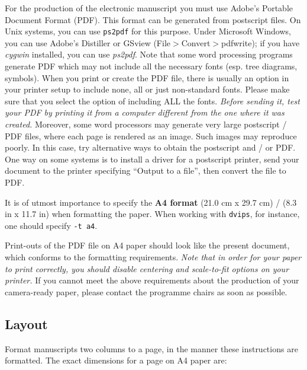 \documentclass[11pt]{article}
\begin{document}
For the production of the electronic manuscript you must use Adobe's
Portable Document Format (PDF). This format can be generated from
postscript files. On Unix systems, you can use {\tt ps2pdf} for
this purpose. Under Microsoft Windows, you can use Adobe's Distiller
or GSview (File$>$Convert$>$pdfwrite); if you have \textit{cygwin}
installed, you can use \textit{ps2pdf}. Note that
some word processing programs generate PDF which may not include all
the necessary fonts (esp. tree diagrams, symbols). When you print or
create the PDF file, there is usually an option in your printer setup
to include none, all or just non-standard fonts.  Please make sure
that you select the option of including ALL the fonts. {\em Before
sending it, test your PDF by printing it from a computer different
from the one where it was created.} Moreover, some word processors may
generate very large postscript / PDF files, where each page is rendered
as an image. Such images may reproduce poorly. In this case, try
alternative ways to obtain the postscript and / or PDF. One way on some
systems is to install a driver for a postscript printer, send your
document to the printer specifying ``Output to a file'', then convert
the file to PDF.


It is of utmost importance to specify the \textbf{A4 format} (21.0 cm
x 29.7 cm) / (8.3 in x 11.7 in) when formatting the paper. When working with
{\tt dvips}, for instance, one should specify {\tt -t a4}.

Print-outs of the PDF file on A4 paper should look like the present document,
which conforms to the formatting requirements. {\em Note that in order for
your paper to print correctly, you should disable centering and scale-to-fit
options on your printer.} If you cannot meet the above requirements about the
production of your camera-ready paper, please contact the programme chairs
as soon as possible.


\subsection{Layout}
\label{ssec:layout}

Format manuscripts two columns to a page, in the manner these
instructions are formatted. The exact dimensions for a page on
A4 paper are:
\end{document}
